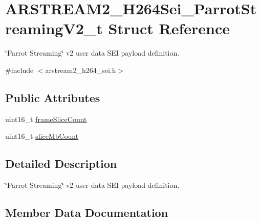 \hypertarget{struct_a_r_s_t_r_e_a_m2___h264_sei___parrot_streaming_v2__t}{}\section{A\+R\+S\+T\+R\+E\+A\+M2\+\_\+\+H264\+Sei\+\_\+\+Parrot\+Streaming\+V2\+\_\+t Struct Reference}
\label{struct_a_r_s_t_r_e_a_m2___h264_sei___parrot_streaming_v2__t}


\char`\"{}\+Parrot Streaming\char`\"{} v2 user data S\+EI payload definition.  




{\ttfamily \#include $<$arstream2\+\_\+h264\+\_\+sei.\+h$>$}

\subsection*{Public Attributes}
\begin{DoxyCompactItemize}
\item 
uint16\+\_\+t \hyperlink{struct_a_r_s_t_r_e_a_m2___h264_sei___parrot_streaming_v2__t_adcb6716da4a43e7041e08a77c700289d}{frame\+Slice\+Count}
\item 
uint16\+\_\+t \hyperlink{struct_a_r_s_t_r_e_a_m2___h264_sei___parrot_streaming_v2__t_a08b04142707156323072c10b1954f66b}{slice\+Mb\+Count}
\end{DoxyCompactItemize}


\subsection{Detailed Description}
\char`\"{}\+Parrot Streaming\char`\"{} v2 user data S\+EI payload definition. 

\subsection{Member Data Documentation}
